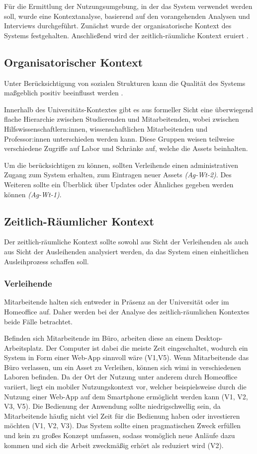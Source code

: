 Für die Ermittlung der Nutzungsumgebung, in der das System verwendet werden soll, wurde eine
Kontextanalyse, basierend auf den vorangehenden Analysen und Interviews durchgeführt. Zunächst wurde
der organisatorische Kontext des Systems festgehalten. Anschließend wird der zeitlich-räumliche
Kontext eruiert \cite{herczeg_software-ergonomie_2018}.

\subsection{Organisatorischer Kontext}
Unter Berücksichtigung von sozialen Strukturen kann die Qualität des Systems maßgeblich positiv
beeinflusst werden \cite{herczeg_software-ergonomie_2018}.

Innerhalb des Universitäts-Kontextes gibt es aus formeller Sicht eine überwiegend flache Hierarchie
zwischen Studierenden und Mitarbeitenden, wobei zwischen Hilfswissenschaftlern:innen,
wissenschaftlichen Mitarbeitenden und Professor:innen unterschieden werden kann. Diese Gruppen
weisen teilweise verschiedene Zugriffe auf Labor und Schränke auf, welche die Assets beinhalten.

Um die  berücksichtigen zu können, sollten Verleihende einen administrativen
Zugang zum System erhalten, zum Eintragen neuer Assets \textit{(Ag-Wt-2)}. Des Weiteren sollte ein
Überblick über Updates oder Ähnliches  gegeben werden können \textit{(Ag-Wt-1)}.


\subsection{Zeitlich-Räumlicher Kontext}
\label{section:zeit}
Der zeitlich-räumliche Kontext sollte sowohl aus Sicht der Verleihenden als auch aus Sicht der
Ausleihenden analysiert werden, da das System einen einheitlichen Ausleihprozess schaffen soll.

\subsubsection{Verleihende}
Mitarbeitende halten sich entweder in Präsenz an der Universität oder im Homeoffice auf. Daher
werden bei der Analyse des zeitlich-räumlichen Kontextes beide Fälle betrachtet.

Befinden sich Mitarbeitende im Büro, arbeiten diese an einem Desktop-Arbeitsplatz. Der Computer ist
dabei die meiste Zeit eingeschaltet, wodurch ein System in Form einer Web-App sinnvoll wäre (V1,V5).
Wenn Mitarbeitende das Büro verlassen, um ein Asset zu Verleihen, können sich \ac{wimi} in
verschiedenen Laboren befinden. Da der Ort der Nutzung unter anderem durch Homeoffice variiert,
liegt ein mobiler Nutzungskontext vor, welcher beispielsweise durch die Nutzung einer Web-App auf
dem Smartphone ermöglicht werden kann (V1, V2, V3, V5). Die Bedienung der Anwendung sollte
niedrigschwellig sein, da Mitarbeitende häufig nicht viel Zeit für die Bedienung haben oder
investieren möchten (V1, V2, V3). Das System sollte einen pragmatischen Zweck erfüllen und kein zu
großes Konzept umfassen, sodass womöglich neue Anläufe dazu kommen und sich die Arbeit zweckmäßig
erhört als reduziert wird (V2).

